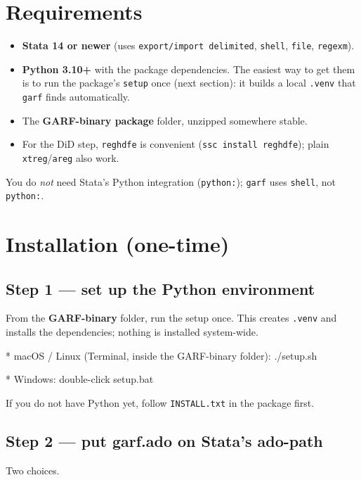 \documentclass[11pt,a4paper]{article}
\newcommand{\code}[1]{\texttt{#1}}
\begin{document}
\section{Requirements}

\begin{itemize}[leftmargin=1.5em,itemsep=2pt,topsep=2pt]
\item \textbf{Stata 14 or newer} (uses \code{export/import delimited}, \code{shell},
      \code{file}, \code{regexm}).
\item \textbf{Python 3.10+} with the package dependencies. The easiest way to get them is to
      run the package's \code{setup} once (next section): it builds a local \code{.venv} that
      \code{garf} finds automatically.
\item The \textbf{GARF-binary package} folder, unzipped somewhere stable.
\item For the DiD step, \code{reghdfe} is convenient (\code{ssc install reghdfe}); plain
      \code{xtreg}/\code{areg} also work.
\end{itemize}

You do \emph{not} need Stata's Python integration (\code{python:}); \code{garf} uses
\code{shell}, not \code{python:}.

\section{Installation (one-time)}

\subsection{Step 1 --- set up the Python environment}
From the \textbf{GARF-binary} folder, run the setup once. This creates \code{.venv} and
installs the dependencies; nothing is installed system-wide.
\begin{stata}
* macOS / Linux (Terminal, inside the GARF-binary folder):
./setup.sh

* Windows: double-click  setup.bat
\end{stata}
If you do not have Python yet, follow \code{INSTALL.txt} in the package first.

\subsection{Step 2 --- put garf.ado on Stata's ado-path}
Two choices.
\end{document}
